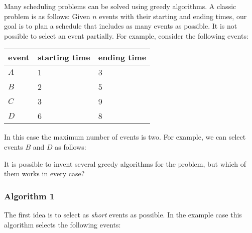 Many scheduling problems can be solved
using greedy algorithms.
A classic problem is as follows:
Given $n$ events with their starting and ending
times, our goal is to plan a schedule
that includes as many events as possible.
It is not possible to select an event partially.
For example, consider the following events:
\begin{center}
\begin{tabular}{lll}
event & starting time & ending time \\
\hline
$A$ & 1 & 3 \\
$B$ & 2 & 5 \\
$C$ & 3 & 9 \\
$D$ & 6 & 8 \\
\end{tabular}
\end{center}
In this case the maximum number of events is two.
For example, we can select events $B$ and $D$
as follows:
\begin{center}
\end{center}

It is possible to invent several greedy algorithms
for the problem, but which of them works in every case?

\subsubsection*{Algorithm 1}

The first idea is to select as \emph{short}
events as possible.
In the example case this algorithm
selects the following events:
\begin{center}
\end{center}

